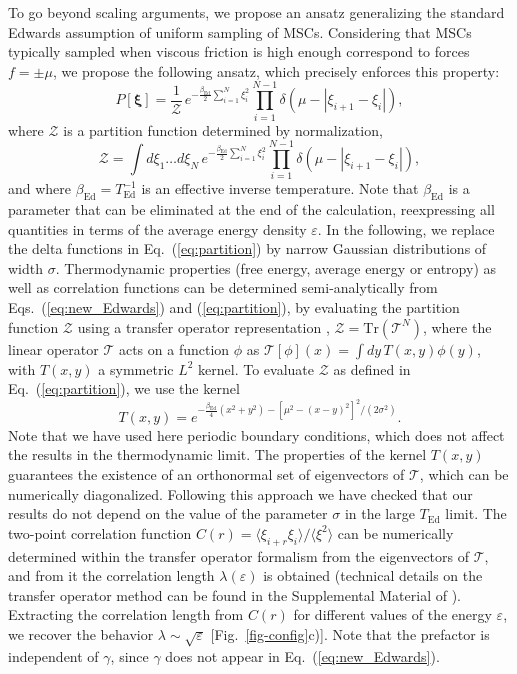 \documentclass[prl,twocolumn,floats,floatfix,aps,superscriptaddress,showpacs]{revtex4-1}
\newcommand{\be}{\begin{equation}}
\newcommand{\ee}{\end{equation}}
\newcommand{\Ted}{T_{\textrm{Ed}}}
\newcommand{\Bed}{\beta_{\textrm{Ed}}}
\newcommand{\ve}{\varepsilon}
\begin{document}
To go beyond scaling arguments, we propose an ansatz generalizing the standard Edwards assumption of uniform sampling of MSCs.
Considering that MSCs typically sampled when viscous friction is high enough correspond to forces $f=\pm \mu$, we propose the following ansatz, which precisely enforces this property:
\be
P[{\boldsymbol \xi}] = \frac{1}{\mathcal{Z}} \, e^{- \frac{\Bed}{2} \sum_{i=1}^N \xi_i^2}
\prod_{i=1}^{N-1} \delta(\mu-|\xi_{i+1}-\xi_i|), 
\label{eq:new_Edwards}
\ee
where $\mathcal{Z}$ is a partition function determined by normalization,
\be \label{eq:partition}
\mathcal{Z} = \int d\xi_1 \dots d\xi_N \,
e^{- \frac{\Bed}{2} \sum_{i=1}^N \xi_i^2} \prod_{i=1}^{N-1} \delta(\mu-|\xi_{i+1}-\xi_i|), 
\ee
and where $\Bed=\Ted^{-1}$ is an effective inverse temperature.
Note that $\Bed$ is a parameter that can be eliminated at the end of the calculation, reexpressing all quantities in terms of the average energy density $\ve$.
%
In the following, we replace the delta functions in Eq.~(\ref{eq:partition})
by narrow Gaussian distributions of width $\sigma$.
Thermodynamic properties (free energy, average energy or entropy) as well as correlation functions can be determined
semi-analytically from Eqs.~(\ref{eq:new_Edwards}) and (\ref{eq:partition}), by evaluating the partition function $\mathcal{Z}$ using a transfer operator representation \cite{Gradenigo15},
$\mathcal{Z}=\textrm{Tr}(\mathcal{T}^N)$, where the linear operator
$\mathcal{T}$ acts on a function $\phi$ as
$\mathcal{T}[\phi](x)= \int dy\, T(x,y) \phi(y)$,
with $T(x,y)$ a symmetric $L^2$ kernel.
To evaluate $\mathcal{Z}$ as defined in Eq.~(\ref{eq:partition}), we use the kernel
\be
T(x,y)= e^{-\frac{\Bed}{4} (x^2+y^2)- [\mu^2-(x-y)^2]^2/(2\sigma^2)}.
\ee
Note that we have used here periodic boundary conditions, which does not affect the results in the thermodynamic limit.
The properties of the kernel $T(x,y)$ guarantees the existence of an
orthonormal set of eigenvectors of $\mathcal{T}$, which can be
numerically diagonalized. Following this approach we have checked that
our results do not depend on the value of
the parameter $\sigma$ in the large $\Ted$ limit.
The two-point correlation function $C(r)=\langle
\xi_{i+r}\xi_i \rangle/\langle \xi^2 \rangle$ can be numerically determined
within the transfer operator formalism from the eigenvectors of
$\mathcal{T}$, and from it the correlation length $\lambda(\ve)$ is
obtained (technical details on the transfer operator method can be found in the Supplemental Material of \cite{Gradenigo15}).
Extracting the correlation length from $C(r)$ for different values of the energy $\ve$, we recover the behavior $\lambda \sim \sqrt{\ve}$ [Fig.~\ref{fig-config}c)].
Note that the prefactor is independent of $\gamma$, since $\gamma$ does not appear in Eq.~(\ref{eq:new_Edwards}).
\end{document}
